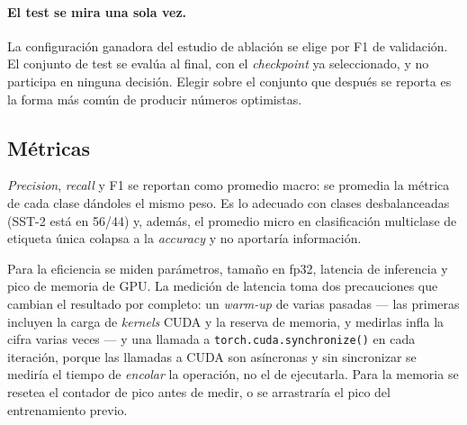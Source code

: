 \paragraph{El test se mira una sola vez.} La configuración ganadora del
estudio de ablación se elige por F1 de validación. El conjunto de test se
evalúa al final, con el \textit{checkpoint} ya seleccionado, y no participa en
ninguna decisión. Elegir sobre el conjunto que después se reporta es la forma
más común de producir números optimistas.

\subsection{Métricas}

\textit{Precision}, \textit{recall} y F1 se reportan como promedio macro: se
promedia la métrica de cada clase dándoles el mismo peso. Es lo adecuado con
clases desbalanceadas (SST-2 está en 56/44) y, además, el promedio micro en
clasificación multiclase de etiqueta única colapsa a la \textit{accuracy} y no
aportaría información.

Para la eficiencia se miden parámetros, tamaño en fp32, latencia de inferencia
y pico de memoria de GPU. La medición de latencia toma dos precauciones que
cambian el resultado por completo: un \textit{warm-up} de varias pasadas
--- las primeras incluyen la carga de \textit{kernels} CUDA y la reserva de
memoria, y medirlas infla la cifra varias veces --- y una llamada a
\texttt{torch.cuda.synchronize()} en cada iteración, porque las llamadas a
CUDA son asíncronas y sin sincronizar se mediría el tiempo de \emph{encolar}
la operación, no el de ejecutarla. Para la memoria se resetea el contador de
pico antes de medir, o se arrastraría el pico del entrenamiento previo.
